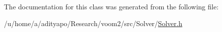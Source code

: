 The documentation for this class was generated from the following file:\begin{DoxyCompactItemize}
\item 
/u/home/a/adityapo/Research/voom2/src/Solver/\hyperlink{_solver_8h}{Solver.h}\end{DoxyCompactItemize}
